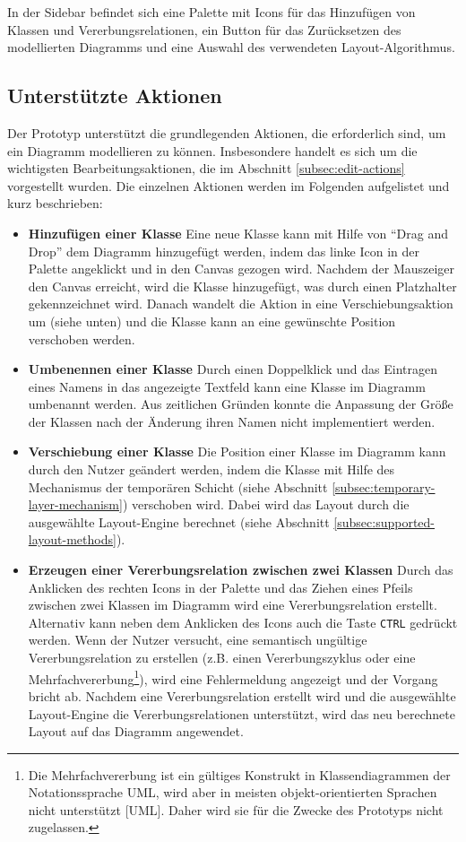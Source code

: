 In der Sidebar befindet sich eine Palette mit Icons für das Hinzufügen von Klassen und Vererbungsrelationen, ein Button für das Zurücksetzen des modellierten Diagramms und eine Auswahl des verwendeten Layout-Algorithmus.

\subsection{Unterstützte Aktionen}

Der Prototyp unterstützt die grundlegenden Aktionen, die erforderlich sind, um ein Diagramm modellieren zu können. Insbesondere handelt es sich um die wichtigsten Bearbeitungsaktionen, die im Abschnitt \ref{subsec:edit-actions} vorgestellt wurden. Die einzelnen Aktionen werden im Folgenden aufgelistet und kurz beschrieben:

\begin{itemize}
    \item \textbf{Hinzufügen einer Klasse} Eine neue Klasse kann mit Hilfe von \enquote{Drag and Drop} dem Diagramm hinzugefügt werden, indem das linke Icon in der Palette angeklickt und in den Canvas gezogen wird. Nachdem der Mauszeiger den Canvas erreicht, wird die Klasse hinzugefügt, was durch einen Platzhalter gekennzeichnet wird. Danach wandelt die Aktion in eine Verschiebungsaktion um (siehe unten) und die Klasse kann an eine gewünschte Position verschoben werden.
    \item \textbf{Umbenennen einer Klasse} Durch einen Doppelklick und das Eintragen eines Namens in das angezeigte Textfeld kann eine Klasse im Diagramm umbenannt werden. Aus zeitlichen Gründen konnte die Anpassung der Größe der Klassen nach der Änderung ihren Namen nicht implementiert werden.
    \item \textbf{Verschiebung einer Klasse} Die Position einer Klasse im Diagramm kann durch den Nutzer geändert werden, indem die Klasse mit Hilfe des Mechanismus der temporären Schicht (siehe Abschnitt \ref{subsec:temporary-layer-mechanism}) verschoben wird. Dabei wird das Layout durch die ausgewählte Layout-Engine berechnet (siehe Abschnitt \ref{subsec:supported-layout-methods}).
    \item \textbf{Erzeugen einer Vererbungsrelation zwischen zwei Klassen} Durch das Anklicken des rechten Icons in der Palette und das Ziehen eines Pfeils zwischen zwei Klassen im Diagramm wird eine Vererbungsrelation erstellt. Alternativ kann neben dem Anklicken des Icons auch die Taste \lstinline{CTRL} gedrückt werden. Wenn der Nutzer versucht, eine semantisch ungültige Vererbungsrelation zu erstellen (z.B. einen Vererbungszyklus oder eine Mehrfachvererbung\footnote{Die Mehrfachvererbung ist ein gültiges Konstrukt in Klassendiagrammen der Notationssprache UML, wird aber in meisten objekt-orientierten Sprachen nicht unterstützt [UML]. Daher wird sie für die Zwecke des Prototyps nicht zugelassen.}), wird eine Fehlermeldung angezeigt und der Vorgang bricht ab. Nachdem eine Vererbungsrelation erstellt wird und die ausgewählte Layout-Engine die Vererbungsrelationen unterstützt, wird das neu berechnete Layout auf das Diagramm angewendet.

\end{itemize}
